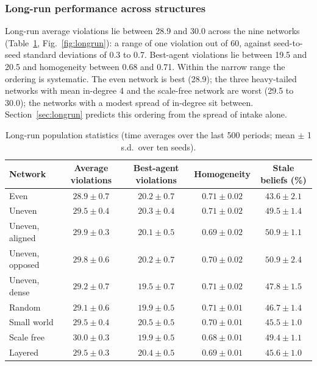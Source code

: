 \documentclass[11pt]{article}
\begin{document}
\subsubsection{Long-run performance across structures}

Long-run average violations lie between 28.9 and 30.0 across the nine networks (Table~\ref{tab:longrun}, Fig.~\ref{fig:longrun}): a range of one violation out of 60, against seed-to-seed standard deviations of 0.3 to 0.7. Best-agent violations lie between 19.5 and 20.5 and homogeneity between 0.68 and 0.71. Within the narrow range the ordering is systematic. The even network is best (28.9); the three heavy-tailed networks with mean in-degree 4 and the scale-free network are worst (29.5 to 30.0); the networks with a modest spread of in-degree sit between. Section~\ref{sec:longrun} predicts this ordering from the spread of intake alone.

\begin{table}[H]
\centering
\caption{Long-run population statistics (time averages over the last 500 periods; mean $\pm$ 1 s.d.\ over ten seeds).}
\label{tab:longrun}
\small
\begin{tabular}{@{}lcccc@{}}
\toprule
Network & Average violations & Best-agent violations & Homogeneity & Stale beliefs (\%) \\
\midrule
Even            & $28.9 \pm 0.7$ & $20.2 \pm 0.7$ & $0.71 \pm 0.02$ & $43.6 \pm 2.1$ \\
Uneven          & $29.5 \pm 0.4$ & $20.3 \pm 0.4$ & $0.71 \pm 0.02$ & $49.5 \pm 1.4$ \\
Uneven, aligned & $29.9 \pm 0.3$ & $20.1 \pm 0.5$ & $0.69 \pm 0.02$ & $50.9 \pm 1.1$ \\
Uneven, opposed & $29.8 \pm 0.6$ & $20.2 \pm 0.7$ & $0.70 \pm 0.02$ & $50.9 \pm 2.4$ \\
Uneven, dense   & $29.2 \pm 0.7$ & $19.5 \pm 0.7$ & $0.71 \pm 0.02$ & $47.8 \pm 1.5$ \\
Random          & $29.1 \pm 0.6$ & $19.9 \pm 0.5$ & $0.71 \pm 0.01$ & $46.7 \pm 1.4$ \\
Small world     & $29.5 \pm 0.4$ & $20.5 \pm 0.5$ & $0.70 \pm 0.01$ & $45.5 \pm 1.0$ \\
Scale free      & $30.0 \pm 0.3$ & $19.9 \pm 0.5$ & $0.68 \pm 0.01$ & $49.4 \pm 1.1$ \\
Layered         & $29.5 \pm 0.3$ & $20.4 \pm 0.5$ & $0.69 \pm 0.01$ & $45.6 \pm 1.0$ \\
\bottomrule
\end{tabular}
\end{table}
\end{document}
